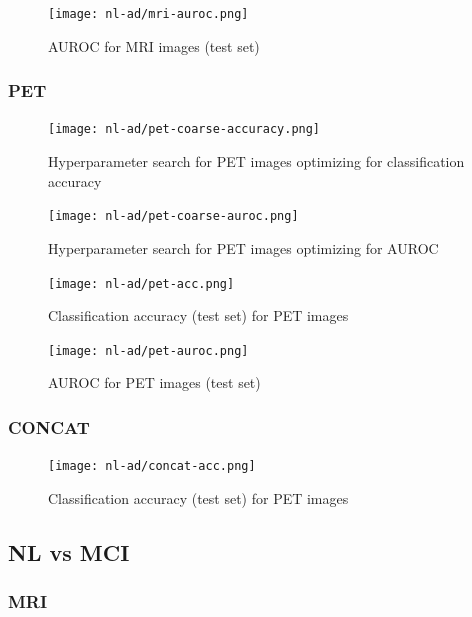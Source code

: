 \documentclass[12pt,a4paper]{article}
\begin{document}
\begin{figure}[H]
  \centering
  \texttt{[image: nl-ad/mri-auroc.png]}
  \caption{\label{fig:desigggn}AUROC for MRI images (test set)}
\end{figure}

\subsubsection{PET}
\label{sec:pet}

\begin{figure}[H]
  \centering
  \texttt{[image: nl-ad/pet-coarse-accuracy.png]}
  \caption{\label{uufig:design}Hyperparameter search for PET images
    optimizing for classification accuracy}
\end{figure}

\begin{figure}[H]
  \centering
  \texttt{[image: nl-ad/pet-coarse-auroc.png]}
  \caption{\label{fiqeg:design}Hyperparameter search for PET images
    optimizing for AUROC}
\end{figure}

\begin{figure}[H]
  \centering
  \texttt{[image: nl-ad/pet-acc.png]}
  \caption{\label{fig:fsdhvdesign}Classification accuracy (test set) for PET images}
\end{figure}

\begin{figure}[H]
  \centering
  \texttt{[image: nl-ad/pet-auroc.png]}
  \caption{\label{fig:design}AUROC for PET images (test set)}
\end{figure}

\subsubsection{CONCAT}
\label{sec:cat}

\begin{figure}[H]
  \centering
  \texttt{[image: nl-ad/concat-acc.png]}
  \caption{\label{fig:desigffhn}Classification accuracy (test set) for PET images}
\end{figure}

\subsection{NL vs MCI}

\subsubsection{MRI}
\end{document}
